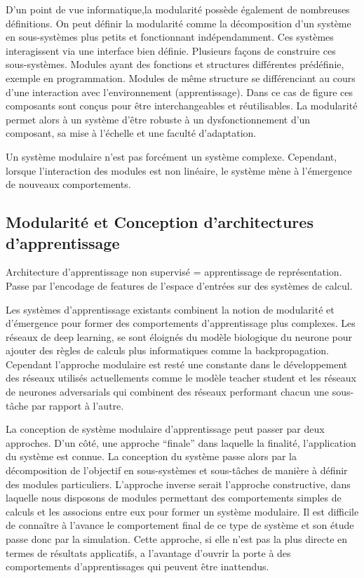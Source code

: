 D'un point de vue informatique,la modularité possède également de nombreuses définitions.
On peut définir la modularité comme la décomposition d'un système en sous-systèmes plus petits et fonctionnant indépendamment. Ces systèmes interagissent via une interface bien définie.
Plusieurs façons de construire ces sous-systèmes.
Modules ayant des fonctions et structures différentes prédéfinie, exemple en programmation.
Modules de même structure se différenciant au cours d'une interaction avec l'environnement (apprentissage). Dans ce cas de figure ces composants sont conçus pour être interchangeables et réutilisables.
La modularité permet alors à un système d'être robuste à un dysfonctionnement d'un composant, sa mise à l'échelle et une faculté d'adaptation.

Un système modulaire n'est pas forcément un système complexe.
Cependant, lorsque l'interaction des modules est non linéaire, le système mène à l'émergence de nouveaux comportements.

\subsection*{Modularité et Conception d'architectures d'apprentissage}

Architecture d'apprentissage non supervisé = apprentissage de représentation. Passe par l'encodage de features de l'espace d'entrées sur des systèmes de calcul. 

Les systèmes d'apprentissage existants combinent la notion de modularité et d'émergence pour former des comportements d'apprentissage plus complexes.
Les réseaux de deep learning, se sont éloignés du modèle biologique du neurone pour ajouter des règles de calculs plus informatiques comme la backpropagation. Cependant l'approche modulaire est resté une constante dans le développement des réseaux utilisés actuellements comme le modèle teacher student et les réseaux de neurones adversarials qui combinent des réseaux performant chacun une sous-tâche par rapport à l'autre.

La conception de système modulaire d'apprentissage peut passer par deux approches. D'un côté, une approche “finale” dans laquelle la finalité, l'application du système est connue. La conception du système passe alors par la décomposition de l'objectif en sous-systèmes et sous-tâches de manière à définir des modules particuliers.
L'approche inverse serait l'approche constructive, dans laquelle nous disposons de modules permettant des comportements simples de calculs et les associons entre eux pour former un système modulaire. Il est difficile de connaître à l'avance le comportement final de ce type de système et son étude passe donc par la simulation.
Cette approche, si elle n'est pas la plus directe en termes de résultats applicatifs, a l'avantage d'ouvrir la porte à des comportements d'apprentissages qui peuvent être inattendus. 

